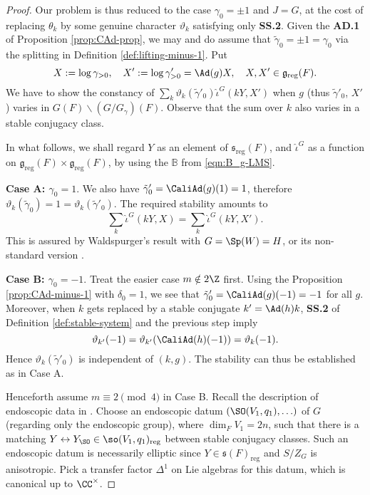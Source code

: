 \documentclass[a4paper,10pt]{article}
\begin{document}
\begin{proof}
	Our problem is thus reduced to the case $\gamma_0 = \pm 1$ and $J = G$, at the cost of replacing $\theta_k$ by some genuine character $\vartheta_k$ satisfying only \textbf{SS.2}. Given the \textbf{AD.1} of Proposition \ref{prop:CAd-prop}, we may and do assume that $\tilde{\gamma}_0 = \pm 1 = \gamma_0$ via the splitting in Definition \ref{def:lifting-minus-1}. Put
	\[ X := \log \gamma_{>0}, \quad X' := \log \gamma'_{>0} = \Ad(g)X, \quad X,X' \in \mathfrak{g}_\text{reg}(F). \]
	We have to show the constancy of $\sum_k \vartheta_k(\tilde{\gamma}'_0) \hat{\iota}^G(kY, X')$ when $g$ (thus $\tilde{\gamma}'_0$, $X'$) varies in $G(F) \backslash (G/G_\gamma)(F)$. Observe that the sum over $k$ also varies in a stable conjugacy class.
	
	In what follows, we shall regard $Y$ as an element of $\mathfrak{s}_\text{reg}(F)$, and $\hat{\iota}^G$ as a function on $\mathfrak{g}_\text{reg}(F) \times \mathfrak{g}_\text{reg}(F)$, by using the $\mathbb{B}$ from \eqref{eqn:B_g-LMS}.
	
	\textbf{Case A: $\gamma_0 = 1$}. We also have $\tilde{\gamma}'_0 = \CaliAd(g)(1) = 1$, therefore $\vartheta_k(\tilde{\gamma}_0) = 1 = \vartheta_k(\tilde{\gamma}'_0)$. The required stability amounts to
	\begin{equation}\label{eqn:stability-easy}
		\sum_k \hat{\iota}^G(kY, X) = \sum_k \hat{\iota}^G(kY, X').
	\end{equation}
	This is assured by Waldspurger's result \cite[1.6 Corollaire]{Wa97} with $G = \Sp(W) = H$, or its non-standard version \cite[\S 1.8]{Wa08}.
	
	\textbf{Case B: $\gamma_0 = -1$}. Treat the easier case $m \notin 2\Z$ first. Using the Proposition \ref{prop:CAd-minus-1} with $\delta_0=1$, we see that $\tilde{\gamma}'_0 = \CaliAd(g)(-1) = -1$ for all $g$. Moreover, when $k$ gets replaced by a stable conjugate $k' = \Ad(h)k$, \textbf{SS.2} of Definition \ref{def:stable-system} and the previous step imply
	\[ \vartheta_{k'}(-1) = \vartheta_{k'}(\CaliAd(h)(-1)) = \vartheta_k(-1). \]
	Hence $\vartheta_k(\tilde{\gamma}'_0)$ is independent of $(k,g)$. The stability can thus be established as in Case A.
	
	Henceforth assume $m \equiv 2 \pmod 4$ in Case B. Recall the description of endoscopic data in \cite[Chapitre X]{Wa01}. Choose an endoscopic datum $(\SO(V_1, q_1), \ldots)$ of $G$ (regarding only the endoscopic group), where $\dim_F V_1 = 2n$, such that there is a matching $Y \leftrightarrow Y_{\SO} \in \so(V_1, q_1)_\text{reg}$ between stable conjugacy classes. Such an endoscopic datum is necessarily elliptic since $Y \in \mathfrak{s}(F)_\text{reg}$ and $S/Z_G$ is anisotropic. Pick a transfer factor $\Delta^1$ on Lie algebras for this datum, which is canonical up to $\CC^\times$.


\end{proof}
\end{document}
